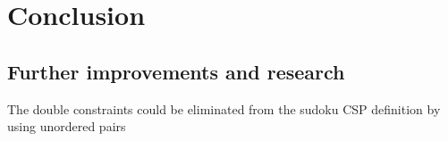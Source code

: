 \section{Conclusion}\label{sec:conclusion}

\subsection{Further improvements and research}\label{sec:further}

The double constraints could be eliminated from the sudoku CSP definition by using unordered pairs

